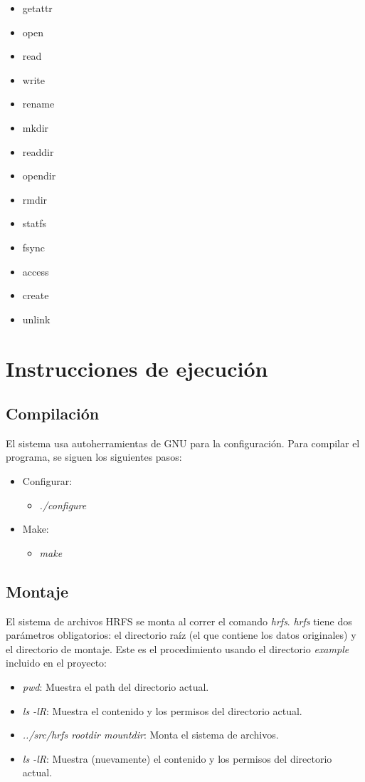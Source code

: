 \documentclass{article}
\begin{document}
\begin{itemize}
  \item getattr
  \item open
  \item read
  \item write
  \item rename
  \item mkdir
  \item readdir
  \item opendir
  \item rmdir
  \item statfs
  \item fsync
  \item access
  \item create
  \item unlink
\end{itemize}

\section{Instrucciones de ejecuci\'on}
\subsection{Compilaci\'on}
El sistema usa autoherramientas de GNU para la configuraci\'on. Para compilar el programa, se siguen los siguientes pasos:
\begin{itemize}
  \item Configurar:
  \begin{itemize}
    \item \emph{./configure}
  \end{itemize}
  \item Make:
  \begin{itemize}
    \item \emph{make}
  \end{itemize}
\end{itemize}

\subsection{Montaje}
El sistema de archivos HRFS se monta al correr el comando \emph{hrfs}. \emph{hrfs} tiene dos par\'ametros obligatorios: el directorio ra\'iz (el que contiene los datos originales) y el directorio de montaje. Este es el procedimiento usando el directorio \emph{example} incluido en el proyecto:

\begin{itemize}
  \item \emph{pwd}: Muestra el path del directorio actual.
  \item \emph{ls -lR}: Muestra el contenido y los permisos del directorio actual.
  \item \emph{../src/hrfs rootdir mountdir}: Monta el sistema de archivos.
  \item \emph{ls -lR}: Muestra (nuevamente) el contenido y los permisos del directorio actual.
\end{itemize}
\end{document}
